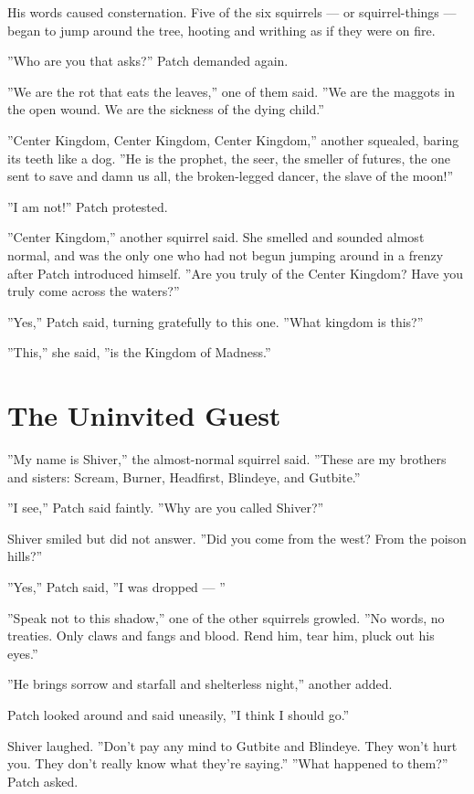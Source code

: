 \documentclass[12pt]{book}
\begin{document}
His words caused consternation. Five of the six squirrels ---
or squirrel-things ---
began to jump around the tree, hooting and writhing as if they were on fire.

''Who are you that asks?'' Patch demanded again.

''We are the rot that eats the leaves,'' one of them said. ''We are the maggots in the open wound. We are the sickness of the dying child.''

''Center Kingdom, Center Kingdom, Center Kingdom,'' another squealed, baring its teeth like a dog. ''He is the prophet, the seer, the smeller of futures, the one sent to save and damn us all, the broken-legged dancer, the slave of the moon!''

''I am not!'' Patch protested.

''Center Kingdom,'' another squirrel said. She smelled and sounded almost normal, and was the only one who had not begun jumping around in a frenzy after Patch introduced himself. ''Are you truly of the Center Kingdom? Have you truly come across the waters?''

''Yes,'' Patch said, turning gratefully to this one. ''What kingdom is this?''

''This,'' she said, ''is the Kingdom of Madness.''


\section{The Uninvited Guest}

''My name is Shiver,'' the almost-normal squirrel said. ''These are my brothers and sisters: Scream, Burner, Headfirst, Blindeye, and Gutbite.''

''I see,'' Patch said faintly. ''Why are you called Shiver?''

Shiver smiled but did not answer. ''Did you come from the west? From the poison hills?''

''Yes,'' Patch said, ''I was dropped ---
''

''Speak not to this shadow,'' one of the other squirrels growled. ''No words, no treaties. Only claws and fangs and blood. Rend him, tear him, pluck out his eyes.''

''He brings sorrow and starfall and shelterless night,'' another added.

Patch looked around and said uneasily, ''I think I should go.''

Shiver laughed. ''Don't pay any mind to Gutbite and Blindeye. They won't hurt you. They don't really know what they're saying.'' ''What happened to them?'' Patch asked.
\end{document}

